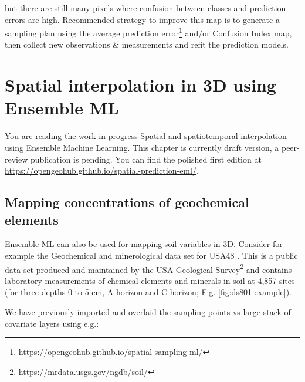 \documentclass[
  graybox,natbib,nospthms]{svmono}
\newenvironment{Shaded}{\begin{snugshade}}{\end{snugshade}}
\newcommand{\CommentTok}[1]{\textcolor[rgb]{0.37,0.37,0.37}{\textit{#1}}}
\newcommand{\FunctionTok}[1]{\textcolor[rgb]{0,0,0}{#1}}
\newcommand{\NormalTok}[1]{#1}
\newcommand{\SpecialCharTok}[1]{\textcolor[rgb]{0,0,0}{#1}}
\renewcommand{\href}[2]{#2 (\url{#1})}
\renewcommand{\href}[2]{#2\footnote{\url{#1}}}
\begin{document}
\begin{Shaded}
\end{Shaded}

but there are still many pixels where confusion between classes and prediction
errors are high. Recommended strategy to improve this map is to generate \href{https://opengeohub.github.io/spatial-sampling-ml/}{a sampling
plan using the average prediction error} and/or Confusion Index map, then collect
new observations \& measurements and refit the prediction models.

\hypertarget{spatial-interpolation-in-3d-using-ensemble-ml}{%
\chapter{Spatial interpolation in 3D using Ensemble ML}\label{spatial-interpolation-in-3d-using-ensemble-ml}}

You are reading the work-in-progress Spatial and spatiotemporal interpolation using Ensemble Machine Learning. This chapter is currently draft version, a peer-review publication is pending. You can find the polished first edition at \url{https://opengeohub.github.io/spatial-prediction-eml/}.

\hypertarget{mapping-concentrations-of-geochemical-elements}{%
\section{Mapping concentrations of geochemical elements}\label{mapping-concentrations-of-geochemical-elements}}

Ensemble ML can also be used for mapping soil variables in 3D. Consider for example
the Geochemical and minerological data set for USA48 \citep{smith2014geochemical}. This is a public data set
produced and maintained by the \href{https://mrdata.usgs.gov/ngdb/soil/}{USA Geological Survey} and contains laboratory measurements
of chemical elements and minerals in soil at 4,857 sites (for three depths 0 to 5 cm,
A horizon and C horizon; Fig. \ref{fig:ds801-example}).

We have previously imported and overlaid the sampling points vs large stack of
covariate layers using e.g.:
\end{document}
